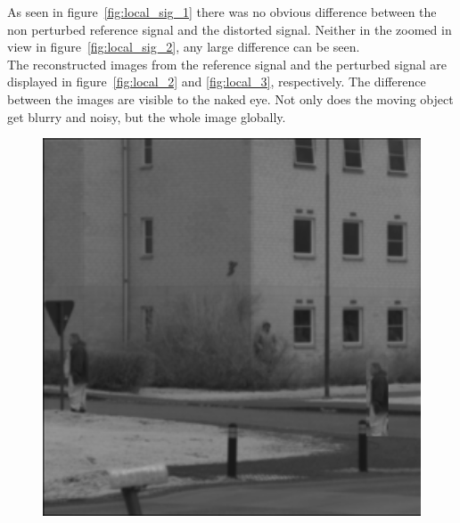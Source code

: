 As seen in figure~\ref{fig:local_sig_1} there was no obvious difference between the non perturbed reference signal and the distorted signal. Neither in the zoomed in view in figure~\ref{fig:local_sig_2}, any large difference can be seen.\\[0.1in]

The reconstructed images from the reference signal and the perturbed signal are displayed in figure~\ref{fig:local_2} and \ref{fig:local_3}, respectively. The difference between the images are visible to the naked eye. Not only does the moving object get blurry and noisy, but the whole image globally.


\begin{figure}[H]
    \centering
\begin{minipage}[t]{0.32\textwidth}
    \includegraphics[width=1\textwidth]{result/dynamic/local/local_whole_time_org.png}
    \subcaption{}
    \label{fig:local_1}
\end{minipage}
\begin{minipage}[t]{0.32\textwidth}

\end{minipage}
\end{figure}
